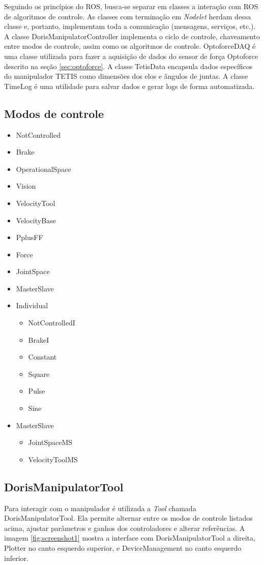 Seguindo os princípios do ROS, busca-se separar em classes a interação com ROS de algoritmos de controle. As classes com terminação em \textit{Nodelet} herdam dessa classe e, portanto, implementam toda a comunicação (mensagens, serviços, etc.). A classe DorisManipulatorController implementa o ciclo de controle, chaveamento entre modos de controle, assim como os algoritmos de controle. OptoforceDAQ é uma classe utilizada para fazer a aquisição de dados do sensor de força Optoforce descrito na seção \ref{sec:optoforce}. A classe TetisData encapsula dados específicos do manipulador TETIS como dimensões dos elos e ângulos de juntas. A classe TimeLog é uma utilidade para salvar dados e gerar logs de forma automatizada. 

\subsection{Modos de controle} \label{sec:ctrlmodes}

\begin{itemize}
\item NotControlled
\item Brake
\item OperationalSpace
\item Vision
\item VelocityTool
\item VelocityBase
\item PplusFF
\item Force
\item JointSpace
\item MasterSlave
\item Individual
	\begin{itemize}
	\item NotControlledI
	\item BrakeI
	\item Constant
	\item Square
	\item Pulse
	\item Sine
	\end{itemize}
\item MasterSlave
	\begin{itemize}
	\item JointSpaceMS
	\item VelocityToolMS
	\end{itemize}
\end{itemize}

\subsection{DorisManipulatorTool}
Para interagir com o manipulador é utilizada a \textit{Tool} chamada DorisManipulatorTool. Ela permite alternar entre os modos de controle listados acima, ajustar parâmetros e ganhos dos controladores e alterar referências. A imagem \ref{fig:screenshot1} mostra a interface com DorisManipulatorTool a direita,  Plotter no canto esquerdo superior, e DeviceManagement no canto esquerdo inferior.
 
